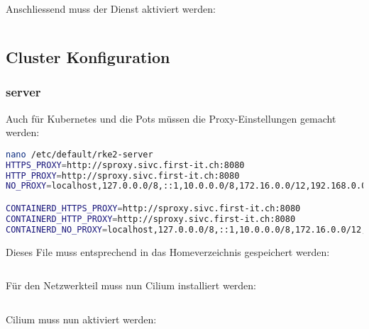 Anschliessend muss der Dienst aktiviert werden:
\lstset{style=gra_codestyle}
\begin{lstlisting}[language=bash, caption=rke2 agent aktivieren,captionpos=b,label={lst:rke2-agent-enable},breaklines=true]

\end{lstlisting}

\subsection{Cluster Konfiguration}
\subsubsection{server}
Auch für Kubernetes und die Pots müssen die Proxy-Einstellungen gemacht werden:
\lstset{style=gra_codestyle}
\begin{lstlisting}[language=bash, caption=rke2 server proxy,captionpos=b,label={lst:rke2-server-proxy},breaklines=true]
nano /etc/default/rke2-server
HTTPS_PROXY=http://sproxy.sivc.first-it.ch:8080
HTTP_PROXY=http://sproxy.sivc.first-it.ch:8080
NO_PROXY=localhost,127.0.0.0/8,::1,10.0.0.0/8,172.16.0.0/12,192.168.0.0/16

CONTAINERD_HTTPS_PROXY=http://sproxy.sivc.first-it.ch:8080
CONTAINERD_HTTP_PROXY=http://sproxy.sivc.first-it.ch:8080
CONTAINERD_NO_PROXY=localhost,127.0.0.0/8,::1,10.0.0.0/8,172.16.0.0/12,192.168.0.0/16
\end{lstlisting}

Dieses File muss entsprechend in das Homeverzeichnis gespeichert werden:
\lstset{style=gra_codestyle}
\begin{lstlisting}[language=bash, caption=rke2 server proxy kopieren,captionpos=b,label={lst:rke2-server-proxy-copy},breaklines=true]

\end{lstlisting}

Für den Netzwerkteil muss nun Cilium installiert werden:
\lstset{style=gra_codestyle}
\begin{lstlisting}[language=bash, caption=rke2 server cilium installieren,captionpos=b,label={lst:rke2-server-cilium-install},breaklines=true]

\end{lstlisting}

Cilium muss nun aktiviert werden:
\begin{lstlisting}[language=bash, caption=rke2 server cilium aktivieren,captionpos=b,label={lst:rke2-server-cilium-apply},breaklines=true]

\end{lstlisting}

